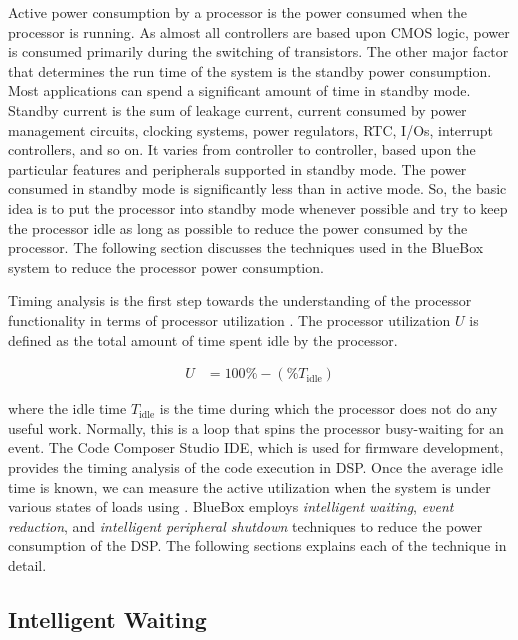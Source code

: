 Active power consumption by a processor is the power consumed when
the processor is running. As almost all controllers are based upon
CMOS logic, power is consumed primarily during the switching of
transistors. The other major factor that determines the run time of
the system is the standby power consumption. Most applications can
spend a significant amount of time in standby mode. Standby current
is the sum of leakage current, current consumed by power management
circuits, clocking systems, power regulators, RTC, I/Os, interrupt
controllers, and so on. It varies from controller to controller,
based upon the particular features and peripherals supported in
standby mode. The power consumed in standby mode is significantly
less than in active mode. So, the basic idea is to put the processor
into standby mode whenever possible and try to keep the processor
idle as long as possible to reduce the power consumed by the
processor. The following section discusses the techniques used in the
BlueBox system to reduce the processor power consumption. 

Timing analysis is the first step towards the understanding of the
processor functionality in terms of processor utilization
\cite{sastra}. The processor utilization $U$ is defined as the total
amount of time spent idle by the processor. 

\begin{align}
	U &= 100\% - (\% T_\text{idle})
\label{eq:idleUtil}
\end{align}

where the idle time $T_\text{idle}$ is the time during which the
processor does not do any useful work. Normally, this is a loop that
spins the processor busy-waiting for an event. The Code Composer
Studio IDE, which is used for firmware development, provides the
timing analysis of the code execution in DSP. Once the average idle
time is known, we can measure the active utilization when the system
is under various states of loads using . BlueBox
employs \emph{intelligent waiting}, \emph{event reduction}, and
\emph{intelligent peripheral shutdown} techniques to reduce the power
consumption of the DSP. The following sections explains each of the
technique in detail. 

\subsection{Intelligent Waiting}

